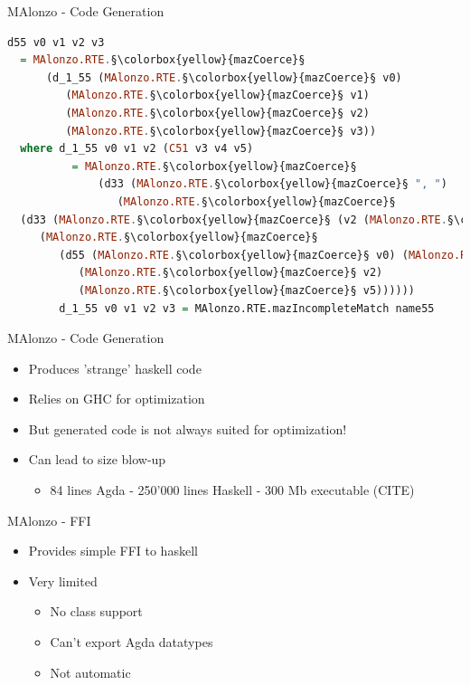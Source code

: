 \begin{frame}[fragile]{MAlonzo - Code Generation}
\begin{lstlisting}[language=Haskell,basicstyle=\scriptsize]
d55 v0 v1 v2 v3
  = MAlonzo.RTE.§\colorbox{yellow}{mazCoerce}§
      (d_1_55 (MAlonzo.RTE.§\colorbox{yellow}{mazCoerce}§ v0)
         (MAlonzo.RTE.§\colorbox{yellow}{mazCoerce}§ v1)
         (MAlonzo.RTE.§\colorbox{yellow}{mazCoerce}§ v2)
         (MAlonzo.RTE.§\colorbox{yellow}{mazCoerce}§ v3))
  where d_1_55 v0 v1 v2 (C51 v3 v4 v5)
          = MAlonzo.RTE.§\colorbox{yellow}{mazCoerce}§
              (d33 (MAlonzo.RTE.§\colorbox{yellow}{mazCoerce}§ ", ")
                 (MAlonzo.RTE.§\colorbox{yellow}{mazCoerce}§
  (d33 (MAlonzo.RTE.§\colorbox{yellow}{mazCoerce}§ (v2 (MAlonzo.RTE.§\colorbox{yellow}{mazCoerce}§ v4)))
     (MAlonzo.RTE.§\colorbox{yellow}{mazCoerce}§
        (d55 (MAlonzo.RTE.§\colorbox{yellow}{mazCoerce}§ v0) (MAlonzo.RTE.§\colorbox{yellow}{mazCoerce}§ v3)
           (MAlonzo.RTE.§\colorbox{yellow}{mazCoerce}§ v2)
           (MAlonzo.RTE.§\colorbox{yellow}{mazCoerce}§ v5))))))
        d_1_55 v0 v1 v2 v3 = MAlonzo.RTE.mazIncompleteMatch name55
\end{lstlisting}
\end{frame}

\begin{frame}{MAlonzo - Code Generation}
\begin{itemize}
  \item Produces 'strange' haskell code
  \item Relies on GHC for optimization
  \item But generated code is not always suited for optimization!
  \item Can lead to size blow-up
  \begin {itemize}
    \item 84 lines Agda - 250'000 lines Haskell - 300 Mb executable (CITE)
  \end{itemize}
\end{itemize}
\end{frame}


\begin{frame}{MAlonzo - FFI}
\begin{itemize}
\item Provides simple FFI to haskell
\item Very limited
  \begin{itemize}
    \item No class support
    \item Can't export Agda datatypes
    \item Not automatic
  \end{itemize}
\end{itemize}
\end{frame}

